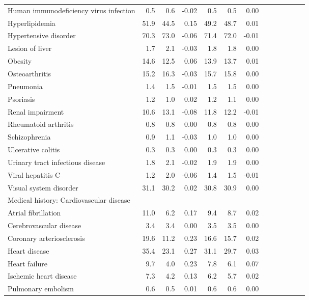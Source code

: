 \documentclass[11pt,]{article}
\begin{document}
\begin{longtable}{lrrrrrrrrrrrr}
      Human immunodeficiency virus infection &  0.5 &  0.6 & -0.02 &  0.5 &  0.5 &  0.00 \\ 
      Hyperlipidemia & 51.9 & 44.5 &  0.15 & 49.2 & 48.7 &  0.01 \\ 
      Hypertensive disorder & 70.3 & 73.0 & -0.06 & 71.4 & 72.0 & -0.01 \\ 
      Lesion of liver &  1.7 &  2.1 & -0.03 &  1.8 &  1.8 &  0.00 \\ 
      Obesity & 14.6 & 12.5 &  0.06 & 13.9 & 13.7 &  0.01 \\ 
      Osteoarthritis & 15.2 & 16.3 & -0.03 & 15.7 & 15.8 &  0.00 \\ 
      Pneumonia &  1.4 &  1.5 & -0.01 &  1.5 &  1.5 &  0.00 \\ 
      Psoriasis &  1.2 &  1.0 &  0.02 &  1.2 &  1.1 &  0.00 \\ 
      Renal impairment & 10.6 & 13.1 & -0.08 & 11.8 & 12.2 & -0.01 \\ 
      Rheumatoid arthritis &  0.8 &  0.8 &  0.00 &  0.8 &  0.8 &  0.00 \\ 
      Schizophrenia &  0.9 &  1.1 & -0.03 &  1.0 &  1.0 &  0.00 \\ 
      Ulcerative colitis &  0.3 &  0.3 &  0.00 &  0.3 &  0.3 &  0.00 \\ 
      Urinary tract infectious disease &  1.8 &  2.1 & -0.02 &  1.9 &  1.9 &  0.00 \\ 
      Viral hepatitis C &  1.2 &  2.0 & -0.06 &  1.4 &  1.5 & -0.01 \\ 
      Visual system disorder & 31.1 & 30.2 &  0.02 & 30.8 & 30.9 &  0.00 \\ 
  Medical history: Cardiovascular disease &    &    &     &    &    &     \\ 
      Atrial fibrillation & 11.0 &  6.2 &  0.17 &  9.4 &  8.7 &  0.02 \\ 
      Cerebrovascular disease &  3.4 &  3.4 &  0.00 &  3.5 &  3.5 &  0.00 \\ 
      Coronary arteriosclerosis & 19.6 & 11.2 &  0.23 & 16.6 & 15.7 &  0.02 \\ 
      Heart disease & 35.4 & 23.1 &  0.27 & 31.1 & 29.7 &  0.03 \\ 
      Heart failure &  9.7 &  4.0 &  0.23 &  7.8 &  6.1 &  0.07 \\ 
      Ischemic heart disease &  7.3 &  4.2 &  0.13 &  6.2 &  5.7 &  0.02 \\ 
      Pulmonary embolism &  0.6 &  0.5 &  0.01 &  0.6 &  0.6 &  0.00 \\ 

\end{longtable}
\end{document}
